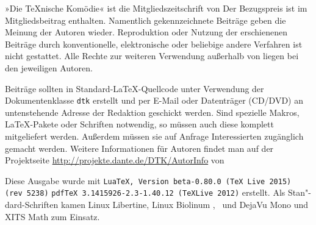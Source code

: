 \begingroup
\small

»Die \TeX{}nische Komödie« ist die Mitgliedszeitschrift von
\dante{} Der Bezugspreis ist im Mitgliedsbeitrag enthalten.
Namentlich gekennzeichnete Beiträge geben die Meinung der
Autoren wieder.  Reproduktion oder Nutzung der erschienenen
Beiträge durch konventionelle, elektronische oder beliebige andere
Verfahren ist nicht gestattet. Alle Rechte zur weiteren Verwendung
außerhalb von \dante{} liegen bei den jeweiligen Autoren.

Beiträge sollten in Standard-\LaTeX-Quellcode unter Verwendung der
Dokumentenklasse \texttt{dtk} erstellt und per \mbox{E-Mail} oder
Datenträger (CD/DVD) an untenstehende Adresse
der Redaktion geschickt werden.  Sind
spezielle Makros, \LaTeX-Pakete oder Schriften notwendig, so
müssen auch diese komplett mitgeliefert werden.  Außerdem müssen sie auf
Anfrage Interessierten zugänglich gemacht werden. Weitere Informationen
für Autoren
findet man auf der Projektseite \url{http://projekte.dante.de/DTK/AutorInfo}
von \dante

\smallskip




Diese Ausgabe wurde mit
\ifluatex
\texttt{LuaTeX, Version beta-0.80.0 (TeX Live 2015) (rev 5238)}
\else
\texttt{pdfTeX 3.1415926-2.3-1.40.12 (\TeX Live 2012)}
\fi
erstellt.
Als Stan"-dard-Schriften kamen Linux Libertine, Linux Biolinum%
\ifluatex, \else\ und \fi DejaVu Mono
\ifluatex und XITS %
Math \fi
zum Einsatz.

